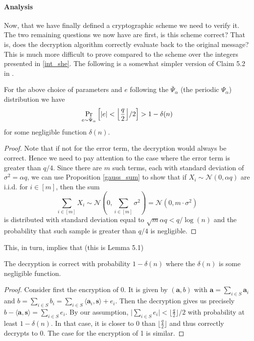 \paragraph{Analysis}
Now, that we have finally defined a cryptographic scheme we need to verify it. The two remaining questions we now have are first, is this scheme correct? That is, does the decryption algorithm correctly evaluate back to the original message? This is much more difficult to prove compared to the scheme over the integers presented in \ref{int_she}. The following is a somewhat simpler version of Claim 5.2 in \cite{regev}.
\begin{lemma}[Correctness]
	For the above choice of parameters and $e$ following the $\bar{\Psi}_{\alpha}$ (the periodic $\Psi_{\alpha}$) distribution we have
	\begin{equation} \Pr_{e \sim \bar{\Psi}_{\alpha}} \Big[ |e| < \Bigl \lfloor \frac{q}{2} \Bigr \rfloor /2 \Big] > 1 - \delta(n) \end{equation}
    for some negligible function $\delta(n)$.
\end{lemma}
\begin{proof}
	Note that if not for the error term, the decryption would always be correct. Hence we need to pay attention to the case where the error term is greater than $q/4$. Since there are $m$ such terms, each with standard deviation of $\sigma^2 = \alpha q$, we can use Proposition \ref{gauss_sum} to show that if $X_i \sim \mathcal{N}(0, \alpha q)$ are i.i.d. for $i \in [m]$, then the sum
	\[ \sum_{i \in [m]} X_i \sim \mathcal{N}(0, \sum_{i \in [m]} \sigma^2) = \mathcal{N}(0, m \cdot \sigma^2)\]
	is distributed with standard deviation equal to $\sqrt{m} \alpha q < q / \log(n)$ and the probability that such sample is greater than $q/4$ is negligible.
\end{proof}

This, in turn, implies that (this is Lemma 5.1)
\begin{lemma}
    The decryption is correct with probability $1 - \delta(n)$ where the $\delta(n)$ is some negligible function.
\end{lemma}

\begin{proof}
    Consider first the encryption of 0. It is given by $(\bm{a}, b)$ with $\bm{a} = \sum_{i \in S}\bm{a}_i$ and $b = \sum_{i \in S} b_i = \sum_{i \in S} \langle \bm{a}_i, \bm{s} \rangle + e_i$. Then the decryption gives us precisely $b - \langle \bm{a}, \bm{s} \rangle = \sum_{i \in S} e_i$. By our assumption, $\big| \sum_{i \in S} e_i \big| < \bigl \lfloor \frac{q}{2} \bigr \rfloor /2$ with probability at least $1 - \delta(n)$. In that case, it is closer to 0 than $\bigl \lfloor \frac{q}{2} \bigr \rfloor$ and thus correctly decrypts to 0. The case for the encryption of 1 is similar.
\end{proof}

